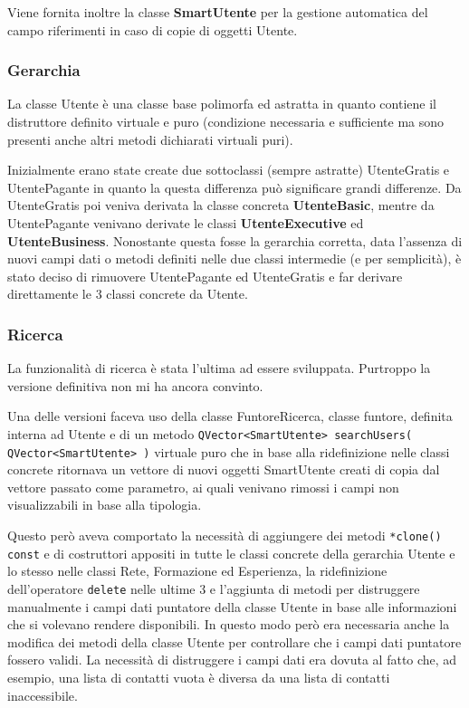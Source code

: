 \documentclass[a4paper]{article}
\begin{document}
Viene fornita inoltre la classe \textbf{SmartUtente} per la gestione automatica del campo riferimenti in caso di copie di oggetti Utente.

\subsubsection*{Gerarchia}
La classe Utente è una classe base polimorfa ed astratta in quanto contiene il distruttore definito virtuale e puro (condizione necessaria e sufficiente ma sono presenti anche altri metodi dichiarati virtuali puri).

Inizialmente erano state create due sottoclassi (sempre astratte) UtenteGratis e UtentePagante in quanto la questa differenza può significare grandi differenze. Da UtenteGratis poi veniva derivata la classe concreta \textbf{UtenteBasic}, mentre da UtentePagante venivano derivate le classi \textbf{UtenteExecutive} ed \textbf{UtenteBusiness}. Nonostante questa fosse la gerarchia corretta, data l'assenza di nuovi campi dati o metodi definiti nelle due classi intermedie (e per semplicità), è stato deciso di rimuovere UtentePagante ed UtenteGratis e far derivare direttamente le 3 classi concrete da Utente.

\subsubsection*{Ricerca}
La funzionalità di ricerca è stata l'ultima ad essere sviluppata. Purtroppo la versione definitiva non mi ha ancora convinto.

Una delle versioni faceva uso della classe FuntoreRicerca, classe funtore, definita interna ad Utente e di un metodo \texttt{QVector<SmartUtente> searchUsers( QVector<SmartUtente> )} virtuale puro che in base alla ridefinizione nelle classi concrete ritornava un vettore di nuovi oggetti SmartUtente creati di copia dal vettore passato come parametro, ai quali venivano rimossi i campi non visualizzabili in base alla tipologia. 

Questo però aveva comportato la necessità di aggiungere dei metodi \texttt{*clone() const} e di costruttori appositi in tutte le classi concrete della gerarchia Utente e lo stesso nelle classi Rete, Formazione ed Esperienza, la ridefinizione dell'operatore \texttt{delete} nelle ultime 3 e l'aggiunta di metodi per distruggere manualmente i campi dati puntatore della classe Utente in base alle informazioni che si volevano rendere disponibili. In questo modo però era necessaria anche la modifica dei metodi della classe Utente per controllare che i campi dati puntatore fossero validi. La necessità di distruggere i campi dati era dovuta al fatto che, ad esempio, una lista di contatti vuota è diversa da una lista di contatti inaccessibile.
\end{document}
